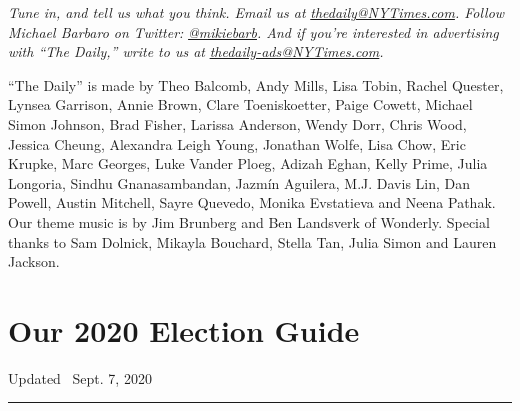 \emph{Tune in, and tell us what you think. Email us at}
\href{mailto:thedaily@NYTimes.com}{\emph{thedaily@NYTimes.com}}\emph{.
Follow Michael Barbaro on Twitter:}
\href{https://twitter.com/mikiebarb}{\emph{@mikiebarb}}\emph{. And if
you're interested in advertising with ``The Daily,'' write to us at}
\href{mailto:thedaily-ads@NYTimes.com}{\emph{thedaily-ads@NYTimes.com}}\emph{.}

``The Daily'' is made by Theo Balcomb, Andy Mills, Lisa Tobin, Rachel
Quester, Lynsea Garrison, Annie Brown, Clare Toeniskoetter, Paige
Cowett, Michael Simon Johnson, Brad Fisher, Larissa Anderson, Wendy
Dorr, Chris Wood, Jessica Cheung, Alexandra Leigh Young, Jonathan Wolfe,
Lisa Chow, Eric Krupke, Marc Georges, Luke Vander Ploeg, Adizah Eghan,
Kelly Prime, Julia Longoria, Sindhu Gnanasambandan, Jazmín Aguilera,
M.J. Davis Lin, Dan Powell, Austin Mitchell, Sayre Quevedo, Monika
Evstatieva and Neena Pathak. Our theme music is by Jim Brunberg and Ben
Landsverk of Wonderly. Special thanks to Sam Dolnick, Mikayla Bouchard,
Stella Tan, Julia Simon and Lauren Jackson.

\hypertarget{our-2020-election-guide}{%
\section{Our 2020 Election Guide}\label{our-2020-election-guide}}

Updated ~Sept. 7, 2020

\begin{center}\rule{0.5\linewidth}{\linethickness}\end{center}

